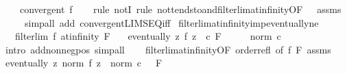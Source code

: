 \begin{isabellebody}
\ \ \ {\isachardoublequoteopen}{\isasymnot}\ convergent\ f{\isachardoublequoteclose}\isanewline
%
\isadelimproof
\ \ %
\endisadelimproof
%
\isatagproof
{}\isamarkupfalse%
\ {\isacharparenleft}{\kern0pt}rule\ notI{\isacharcomma}{\kern0pt}\ rule\ not{\isacharunderscore}{\kern0pt}tendsto{\isacharunderscore}{\kern0pt}and{\isacharunderscore}{\kern0pt}filterlim{\isacharunderscore}{\kern0pt}at{\isacharunderscore}{\kern0pt}infinity{\isacharbrackleft}{\kern0pt}OF\ {\isacharunderscore}{\kern0pt}\ {\isacharunderscore}{\kern0pt}\ assms{\isacharbrackright}{\kern0pt}{\isacharparenright}{\kern0pt}\isanewline
\ \ \ \ \ {\isacharparenleft}{\kern0pt}simp{\isacharunderscore}{\kern0pt}all\ add{\isacharcolon}{\kern0pt}\ convergent{\isacharunderscore}{\kern0pt}LIMSEQ{\isacharunderscore}{\kern0pt}iff{\isacharparenright}{\kern0pt}%
\endisatagproof
{\isafoldproof}%
%
\isadelimproof
\isanewline
%
\endisadelimproof
\isanewline
{}\isamarkupfalse%
\ filterlim{\isacharunderscore}{\kern0pt}at{\isacharunderscore}{\kern0pt}infinity{\isacharunderscore}{\kern0pt}imp{\isacharunderscore}{\kern0pt}eventually{\isacharunderscore}{\kern0pt}ne{\isacharcolon}{\kern0pt}\isanewline
\ \ \ {\isachardoublequoteopen}filterlim\ f\ at{\isacharunderscore}{\kern0pt}infinity\ F{\isachardoublequoteclose}\isanewline
\ \ \ {\isachardoublequoteopen}eventually\ {\isacharparenleft}{\kern0pt}{\isasymlambda}z{\isachardot}{\kern0pt}\ f\ z\ {\isasymnoteq}\ c{\isacharparenright}{\kern0pt}\ F{\isachardoublequoteclose}\isanewline
%
\isadelimproof
%
\endisadelimproof
%
\isatagproof
{}\isamarkupfalse%
\ {\isacharminus}{\kern0pt}\isanewline
\ \ \isamarkupfalse%
\ {\isachardoublequoteopen}norm\ c\ {\isacharplus}{\kern0pt}\ {}\ {\isachargreater}{\kern0pt}\ {}{\isachardoublequoteclose}\isanewline
\ \ \ \ \isamarkupfalse%
\ {\isacharparenleft}{\kern0pt}intro\ add{\isacharunderscore}{\kern0pt}nonneg{\isacharunderscore}{\kern0pt}pos{\isacharparenright}{\kern0pt}\ simp{\isacharunderscore}{\kern0pt}all\isanewline
\ \ \isamarkupfalse%
\ filterlim{\isacharunderscore}{\kern0pt}at{\isacharunderscore}{\kern0pt}infinity{\isacharbrackleft}{\kern0pt}OF\ order{\isachardot}{\kern0pt}refl{\isacharcomma}{\kern0pt}\ of\ f\ F{\isacharbrackright}{\kern0pt}\ assms\isanewline
\ \ \isamarkupfalse%
\ {\isachardoublequoteopen}eventually\ {\isacharparenleft}{\kern0pt}{\isasymlambda}z{\isachardot}{\kern0pt}\ norm\ {\isacharparenleft}{\kern0pt}f\ z{\isacharparenright}{\kern0pt}\ {\isasymge}\ norm\ c\ {\isacharplus}{\kern0pt}\ {}{\isacharparenright}{\kern0pt}\ F{\isachardoublequoteclose}\isanewline

\end{isabellebody}
